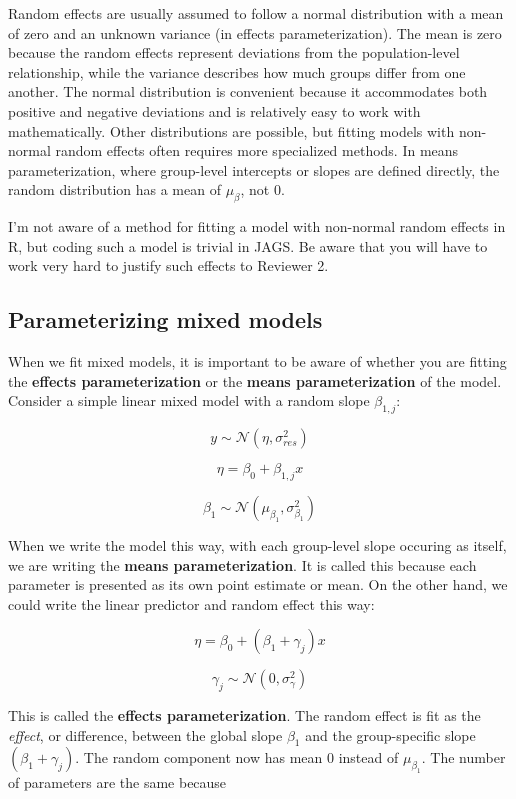 \documentclass[
  13,
  letterpaper,
]{report}
\begin{document}
Random effects are usually assumed to follow a normal distribution with
a mean of zero and an unknown variance (in effects parameterization).
The mean is zero because the random effects represent deviations from
the population-level relationship, while the variance describes how much
groups differ from one another. The normal distribution is convenient
because it accommodates both positive and negative deviations and is
relatively easy to work with mathematically. Other distributions are
possible, but fitting models with non-normal random effects often
requires more specialized methods. In means parameterization, where
group-level intercepts or slopes are defined directly, the random
distribution has a mean of \(\mu_{\beta}\), not 0.

I'm not aware of a method for fitting a model with non-normal random
effects in R, but coding such a model is trivial in JAGS. Be aware that
you will have to work very hard to justify such effects to Reviewer 2.

\subsection{Parameterizing mixed models}\label{sec-mixed-intro-para}

When we fit mixed models, it is important to be aware of whether you are
fitting the \textbf{effects parameterization} or the \textbf{means
parameterization} of the model. Consider a simple linear mixed model
with a random slope \(\beta_{1,j}\):

\[y\sim\mathcal{N}\left(\eta,\sigma^2_{res}\right)\]

\[\eta=\beta_0+\beta_{1,j} x\]

\[\beta_1\sim\mathcal{N}\left(\mu_{\beta_1},\sigma^2_{\beta_1}\right)\]

When we write the model this way, with each group-level slope occuring
as itself, we are writing the \textbf{means parameterization}. It is
called this because each parameter is presented as its own point
estimate or mean. On the other hand, we could write the linear predictor
and random effect this way:

\[\eta=\beta_0+\left(\beta_1+\gamma_j\right)x\]

\[\gamma_j\sim\mathcal{N}\left(0,\sigma^2_{\gamma}\right)\]

This is called the \textbf{effects parameterization}. The random effect
is fit as the \emph{effect}, or difference, between the global slope
\(\beta_1\) and the group-specific slope
\(\left(\beta_1+\gamma_j\right)\). The random component now has mean 0
instead of \(\mu_{\beta_1}\). The number of parameters are the same
because
\end{document}
